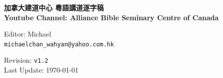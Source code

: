 \documentclass{book}
\author{
  Editor, Michael Chan\\
  \texttt{michaelchan\_wahyan@yahoo.com.hk}
}
\begin{document}
\clearpage
\newcommand\nbvspace[1][3]{\vspace*{\stretch{#1}}}
\newcommand\nbstretchyspace{\spaceskip0.5em plus 0.25em minus 0.25em}
\newcommand{\nbtitlestretch}{\spaceskip0.6em}
\pagestyle{empty}
\begin{center}
\bfseries
\nbvspace[1]
\Huge
{%
\Large
\textbf{加拿大建道中心 粵語講道逐字稿 \\
       Youtube Channel: Alliance Bible Seminary Centre of Canada
       }}

\nbvspace[1]

{\large
Editor: Michael\\
\texttt{michaelchan\_wahyan@yahoo.com.hk}
}

\nbvspace[1]

{\large
Revision: \texttt{v1.2}\\
Last Update: \today
}


\vfill
\begin{tikzpicture}
\end{tikzpicture}
\vfill

\end{center}

\newpage

\setcounter{tocdepth}{0}
\dominitoc
\begin{multicols}{3}
\tableofcontents
\end{multicols}

\large

\end{document}
